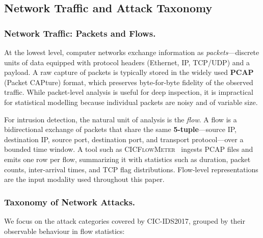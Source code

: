 \subsection{Network Traffic and Attack Taxonomy}
\label{sec:bg-network}

\subsubsection*{Network Traffic: Packets and Flows.}
At the lowest level, computer networks exchange information as \emph{packets}---discrete units of data equipped with protocol headers (Ethernet, IP, TCP/UDP) and a payload. A raw capture of packets is typically stored in the widely used \textbf{PCAP} (Packet CAPture) format, which preserves byte-for-byte fidelity of the observed traffic. While packet-level analysis is useful for deep inspection, it is impractical for statistical modelling because individual packets are noisy and of variable size.

For intrusion detection, the natural unit of analysis is the \emph{flow}. A flow is a bidirectional exchange of packets that share the same \textbf{5-tuple}---source IP, destination IP, source port, destination port, and transport protocol---over a bounded time window. A tool such as \textsc{CICFlowMeter}~\cite{ref_cicflowmeter} ingests PCAP files and emits one row per flow, summarizing it with statistics such as duration, packet counts, inter-arrival times, and TCP flag distributions. Flow-level representations are the input modality used throughout this paper.

\subsubsection*{Taxonomy of Network Attacks.}
We focus on the attack categories covered by CIC-IDS2017, grouped by their observable behaviour in flow statistics:

